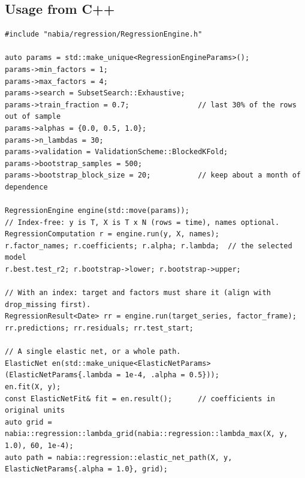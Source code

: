 \subsection{Usage from C++}
\begin{lstlisting}
#include "nabia/regression/RegressionEngine.h"

auto params = std::make_unique<RegressionEngineParams>();
params->min_factors = 1;
params->max_factors = 4;
params->search = SubsetSearch::Exhaustive;
params->train_fraction = 0.7;                // last 30% of the rows out of sample
params->alphas = {0.0, 0.5, 1.0};
params->n_lambdas = 30;
params->validation = ValidationScheme::BlockedKFold;
params->bootstrap_samples = 500;
params->bootstrap_block_size = 20;           // keep about a month of dependence

RegressionEngine engine(std::move(params));
// Index-free: y is T, X is T x N (rows = time), names optional.
RegressionComputation r = engine.run(y, X, names);
r.factor_names; r.coefficients; r.alpha; r.lambda;  // the selected model
r.best.test_r2; r.bootstrap->lower; r.bootstrap->upper;

// With an index: target and factors must share it (align with drop_missing first).
RegressionResult<Date> rr = engine.run(target_series, factor_frame);
rr.predictions; rr.residuals; rr.test_start;

// A single elastic net, or a whole path.
ElasticNet en(std::make_unique<ElasticNetParams>(ElasticNetParams{.lambda = 1e-4, .alpha = 0.5}));
en.fit(X, y);
const ElasticNetFit& fit = en.result();      // coefficients in original units
auto grid = nabia::regression::lambda_grid(nabia::regression::lambda_max(X, y, 1.0), 60, 1e-4);
auto path = nabia::regression::elastic_net_path(X, y, ElasticNetParams{.alpha = 1.0}, grid);
\end{lstlisting}


